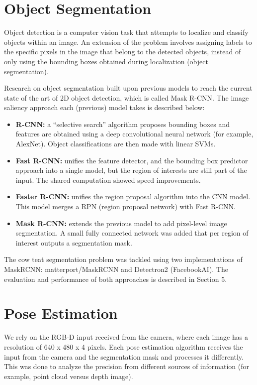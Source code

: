 \section{Object Segmentation}
Object detection is a computer vision task that attempts to localize and classify objects within an image. An extension of the problem involves assigning labels to the specific pixels in the image that belong to the detected objects, instead of only using the bounding boxes obtained during localization (object segmentation). 

Research on object segmentation built upon previous models to reach the current state of the art of 2D object detection, which is called Mask R-CNN. The image saliency approach each (previous) model takes is described below:
\begin{itemize}
    \item \textbf{R-CNN:} a “selective search” algorithm proposes bounding boxes and features are obtained using a deep convolutional neural network (for example, AlexNet). Object classifications are then made with linear SVMs.
    \item \textbf{Fast R-CNN:} unifies the feature detector, and the bounding box predictor approach into a single model, but the region of interests are still part of the input. The shared computation showed speed improvements.
    \item \textbf{Faster R-CNN:} unifies the region proposal algorithm into the CNN model. This model merges a RPN (region proposal network) with Fast R-CNN.
    \item \textbf{Mask R-CNN:} extends the previous model to add pixel-level image segmentation. A small fully connected network was added that per region of interest outputs a segmentation mask.
\end{itemize}

The cow teat segmentation problem was tackled using two implementations of MaskRCNN: matterport/MaskRCNN and Detectron2 (FacebookAI). The evaluation and performance of both approaches is described in Section 5.


\section{Pose Estimation}
We rely on the RGB-D input received from the camera, where each image has a resolution of 640 x 480 x 4 pixels. Each pose estimation algorithm receives the input from the camera and the segmentation mask and processes it differently. This was done to analyze the precision from different sources of information (for example, point cloud versus depth image).

